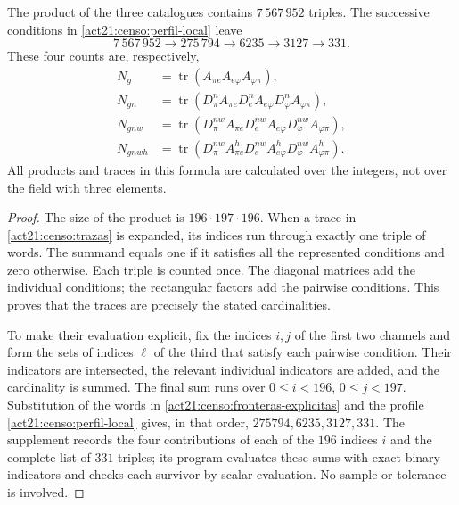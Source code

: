 \begin{samepage}
\begin{theorem}
\label{act21:censo:teorema-conteo}
The product of the three catalogues contains \(7\,567\,952\) triples.
The successive conditions in \eqref{act21:censo:perfil-local} leave
\begin{equation}
 7\,567\,952\longrightarrow275\,794\longrightarrow6235
 \longrightarrow3127\longrightarrow331.
 \label{act21:censo:cadena-local}
\end{equation}
These four counts are, respectively,
\begin{align}
 N_g&=\operatorname{tr}(A_{\pi e}A_{e\varphi}A_{\varphi\pi}),
 \nonumber\\
 N_{gn}&=\operatorname{tr}(D_\pi^n A_{\pi e}
             D_e^n A_{e\varphi}D_\varphi^n A_{\varphi\pi}),
 \nonumber\\
 N_{gnw}&=\operatorname{tr}(D_\pi^{nw} A_{\pi e}
             D_e^{nw} A_{e\varphi}D_\varphi^{nw} A_{\varphi\pi}),
 \nonumber\\
 N_{gnwh}&=\operatorname{tr}(D_\pi^{nw} A^h_{\pi e}
             D_e^{nw} A^h_{e\varphi}D_\varphi^{nw} A^h_{\varphi\pi}).
 \label{act21:censo:trazas}
\end{align}
All products and traces in this formula are calculated over the integers,
not over the field with three elements.
\end{theorem}
\end{samepage}
\begin{proof}
The size of the product is \(196\cdot197\cdot196\). When a trace in
\eqref{act21:censo:trazas} is expanded, its indices run through exactly one
triple of words. The summand equals one if it satisfies all the represented
conditions and zero otherwise. Each triple is counted once.
The diagonal matrices add the individual conditions; the rectangular
factors add the pairwise conditions. This proves that the
traces are precisely the stated cardinalities.

To make their evaluation explicit, fix the indices \(i,j\) of the first
two channels and form the sets of indices \(\ell\) of the third
that satisfy each pairwise condition. Their indicators are intersected,
the relevant individual indicators are added, and the cardinality is summed.
The final sum runs over \(0\leq i<196\), \(0\leq j<197\).
Substitution of the words in \eqref{act21:censo:fronteras-explicitas} and
the profile \eqref{act21:censo:perfil-local} gives, in that order,
\(275794,6235,3127,331\). The supplement records the four contributions
of each of the \(196\) indices \(i\) and the complete list of \(331\) triples;
its program evaluates these sums with exact binary indicators and checks
each survivor by scalar evaluation. No sample or tolerance is involved.
\end{proof}

